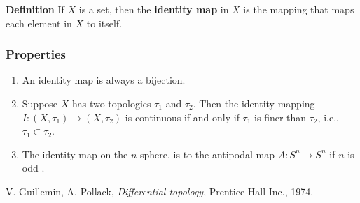 \documentclass[12pt]{article}
\begin{document}
{\bf Definition}
If $X$ is a set, then the {\bf identity map} in $X$ is the mapping 
that maps each element in $X$ to itself. 

\subsubsection{Properties}
\begin{enumerate}
\item An identity map is always a bijection. 
\item Suppose $X$ has two topologies $\tau_1$ and $\tau_2$. Then
the identity mapping $I:(X,\tau_1)\to (X,\tau_2)$ is continuous if and only if
$\tau_1$ is finer than $\tau_2$, i.e., $\tau_1\subset\tau_2$.
\item
 The identity map on the $n$-sphere, is 
to the antipodal map $A:S^n\to S^n$ if $n$ is odd \cite{guillemin}.
 \end{enumerate}
 
 \begin{thebibliography}{9}
  V. Guillemin, A. Pollack,
 \emph{Differential topology}, Prentice-Hall Inc., 1974.
 \end{thebibliography}
\end{document}
